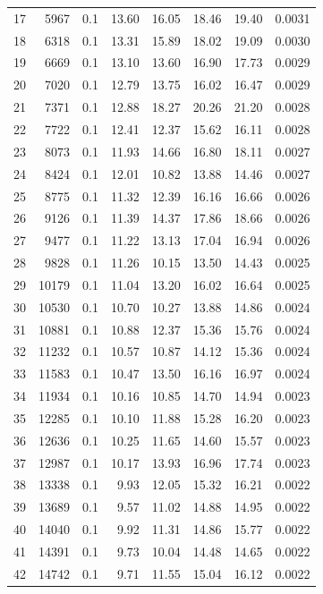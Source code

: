 \documentclass[11pt,a4paper]{article}
\begin{document}
\begin{center}
\begin{longtable}{@{}rrrrrrrr@{}}
17 & 5967 & 0.1 & 13.60 & 16.05 & 18.46 & 19.40 & 0.0031 \\
18 & 6318 & 0.1 & 13.31 & 15.89 & 18.02 & 19.09 & 0.0030 \\
19 & 6669 & 0.1 & 13.10 & 13.60 & 16.90 & 17.73 & 0.0029 \\
20 & 7020 & 0.1 & 12.79 & 13.75 & 16.02 & 16.47 & 0.0029 \\
21 & 7371 & 0.1 & 12.88 & 18.27 & 20.26 & 21.20 & 0.0028 \\
22 & 7722 & 0.1 & 12.41 & 12.37 & 15.62 & 16.11 & 0.0028 \\
23 & 8073 & 0.1 & 11.93 & 14.66 & 16.80 & 18.11 & 0.0027 \\
24 & 8424 & 0.1 & 12.01 & 10.82 & 13.88 & 14.46 & 0.0027 \\
25 & 8775 & 0.1 & 11.32 & 12.39 & 16.16 & 16.66 & 0.0026 \\
26 & 9126 & 0.1 & 11.39 & 14.37 & 17.86 & 18.66 & 0.0026 \\
27 & 9477 & 0.1 & 11.22 & 13.13 & 17.04 & 16.94 & 0.0026 \\
28 & 9828 & 0.1 & 11.26 & 10.15 & 13.50 & 14.43 & 0.0025 \\
29 & 10179 & 0.1 & 11.04 & 13.20 & 16.02 & 16.64 & 0.0025 \\
30 & 10530 & 0.1 & 10.70 & 10.27 & 13.88 & 14.86 & 0.0024 \\
31 & 10881 & 0.1 & 10.88 & 12.37 & 15.36 & 15.76 & 0.0024 \\
32 & 11232 & 0.1 & 10.57 & 10.87 & 14.12 & 15.36 & 0.0024 \\
33 & 11583 & 0.1 & 10.47 & 13.50 & 16.16 & 16.97 & 0.0024 \\
34 & 11934 & 0.1 & 10.16 & 10.85 & 14.70 & 14.94 & 0.0023 \\
35 & 12285 & 0.1 & 10.10 & 11.88 & 15.28 & 16.20 & 0.0023 \\
36 & 12636 & 0.1 & 10.25 & 11.65 & 14.60 & 15.57 & 0.0023 \\
37 & 12987 & 0.1 & 10.17 & 13.93 & 16.96 & 17.74 & 0.0023 \\
38 & 13338 & 0.1 & 9.93 & 12.05 & 15.32 & 16.21 & 0.0022 \\
39 & 13689 & 0.1 & 9.57 & 11.02 & 14.88 & 14.95 & 0.0022 \\
40 & 14040 & 0.1 & 9.92 & 11.31 & 14.86 & 15.77 & 0.0022 \\
41 & 14391 & 0.1 & 9.73 & 10.04 & 14.48 & 14.65 & 0.0022 \\
42 & 14742 & 0.1 & 9.71 & 11.55 & 15.04 & 16.12 & 0.0022 \\

\end{longtable}
\end{center}
\end{document}
